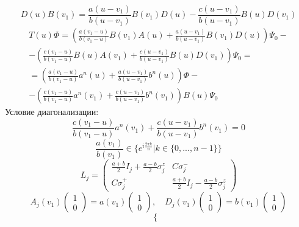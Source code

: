 \documentclass[12pt]{article}
\theoremstyle{definition}
\begin{document}
\begin{enumerate}
\begin{equation}
        D(u)B(v_1)=\frac{a(u-v_1)}{b(u-v_1)}B(v_1)D(u)-\frac{c(u-v_1)}{b(u-v_1)}B(u)D(v_1)
    \end{equation}
    \begin{multline}
        T(u)\Phi=\left(\frac{a(v_1-u)}{b(v_1-u)}B(v_1)A(u)+\frac{a(u-v_1)}{b(u-v_1)}B(v_1)D(u)\right)\Psi_0-\\-\left(\frac{c(v_1-u)}{b(v_1-u)}B(u)A(v_1)+\frac{c(u-v_1)}{b(u-v_1)}B(u)D(v_1)\right)\Psi_0=\\=\left(\frac{a(v_1-u)}{b(v_1-u)}a^n(u)+\frac{a(u-v_1)}{b(u-v_1)}b^n(u)\right)\Phi-\\-\left(\frac{c(v_1-u)}{b(v_1-u)}a^n(v_1)+\frac{c(u-v_1)}{b(u-v_1)}b^n(v_1)\right)B(u)\Psi_0
    \end{multline}
    Условие диагонализации:
    \begin{equation}
        \frac{c(v_1-u)}{b(v_1-u)}a^n(v_1)+\frac{c(u-v_1)}{b(u-v_1)}b^n(v_1)=0
    \end{equation}
    \begin{equation}
        \frac{a(v_1)}{b(v_1)}\in\{e^{i\frac{2\pi k}{n}}|k\in\{0,...,n-1\}\}
    \end{equation}
    \begin{equation}
        L_j=\begin{pmatrix}
            \frac{a+b}{2}I_j+\frac{a-b}{2}\sigma^z_j & C\sigma^-_j\\
            C\sigma^+_j & \frac{a+b}{2}I_j-\frac{a-b}{2}\sigma^z_j
        \end{pmatrix}
    \end{equation}
    \begin{equation}
        A_j(v_1)\begin{pmatrix}
            1\\0
        \end{pmatrix}=a(v_1)\begin{pmatrix}
            1\\0
        \end{pmatrix},\quad D_j(v_1)\begin{pmatrix}
            1\\0
        \end{pmatrix}=b(v_1)\begin{pmatrix}
            1\\0
        \end{pmatrix}
    \end{equation}
    \begin{equation}
        \begin{cases}

\end{cases}
\end{equation}
\end{enumerate}
\end{document}
